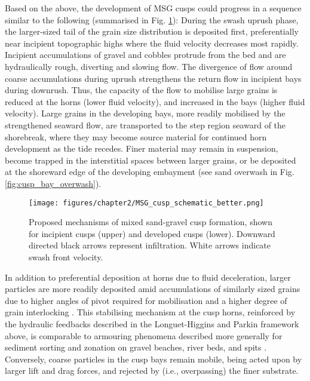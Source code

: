 Based on the above, the development of MSG cusps could progress in a sequence similar to the following (summarised in Fig. \ref{fig:MSG_cusp_schematic}): During the swash uprush phase, the larger-sized tail of the grain size distribution is deposited first, preferentially near incipient topographic highs where the fluid velocity decreases most rapidly. Incipient accumulations of gravel and cobbles protrude from the bed and are hydraulically rough, diverting and slowing flow. The divergence of flow around coarse accumulations during uprush strengthens the return flow in incipient bays during downrush. Thus, the capacity of the flow to mobilise large grains is reduced at the horns (lower fluid velocity), and increased in the bays (higher fluid velocity). Large grains in the developing bays, more readily mobilised by the strengthened seaward flow, are transported to the step region seaward of the shorebreak, where they may become source material for continued horn development as the tide recedes. Finer material may remain in suspension, become trapped in the interstitial spaces between larger grains, or be deposited at the shoreward edge of the developing embayment (see sand overwash in Fig. \ref{fig:cusp_bay_overwash}).

\begin{figure}[tbp] %
  	\texttt{[image: figures/chapter2/MSG\_cusp\_schematic\_better.png]}
 	\caption[Schematic: proposed mechanisms of mixed sand-gravel cusp formation]{Proposed mechanisms of mixed sand-gravel cusp formation, shown for incipient cusps (upper) and developed cusps (lower). Downward directed black arrows represent infiltration. White arrows indicate swash front velocity.}
 	\label{fig:MSG_cusp_schematic}
\end{figure}

In addition to preferential deposition at horns due to fluid deceleration, larger particles are more readily deposited amid accumulations of similarly sized grains due to higher angles of pivot required for mobilisation and a higher degree of grain interlocking \citep[see selection/rejection/acceptance, overpassing:][]{Buscombe_Masselink2006}. This stabilising mechanism at the cusp horns, reinforced by the hydraulic feedbacks described in the Longuet-Higgins and Parkin framework above, is comparable to armouring phenomena described more generally for sediment sorting and zonation on gravel beaches, river beds, and spits \citep[e.g.,][]{Isla1993}. Conversely, coarse particles in the cusp bays remain mobile, being acted upon by larger lift and drag forces, and rejected by (i.e., overpassing) the finer substrate. 

